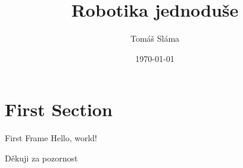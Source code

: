 \documentclass[14pt]{beamer}
\title{Robotika jednoduše}
\date{\today}
\author{Tomáš Sláma}
\institute{Gymnázium Turnov}
\begin{document}
  \maketitle

  \section{First Section}

  \begin{frame}{First Frame}
    Hello, world!
  \end{frame}

  {
  \begin{frame}[standout]
    Děkuji za pozornost
  \end{frame}
  }
\end{document}
